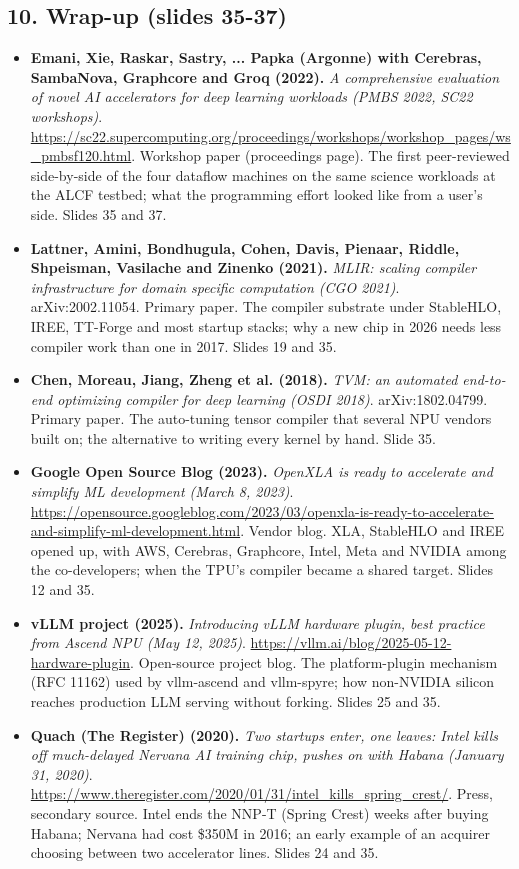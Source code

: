 \documentclass[11pt,letterpaper]{article}
\begin{document}
\subsection*{10. Wrap-up (slides 35-37)}
\begin{itemize}[leftmargin=1.2em,itemsep=3pt]\sloppy
\item \textbf{Emani, Xie, Raskar, Sastry, ... Papka (Argonne) with Cerebras, SambaNova, Graphcore and Groq (2022).} \textit{A comprehensive evaluation of novel AI accelerators for deep learning workloads (PMBS 2022, SC22 workshops)}. \url{https://sc22.supercomputing.org/proceedings/workshops/workshop_pages/ws_pmbsf120.html}. Workshop paper (proceedings page). The first peer-reviewed side-by-side of the four dataflow machines on the same science workloads at the ALCF testbed; what the programming effort looked like from a user's side. Slides 35 and 37.
\item \textbf{Lattner, Amini, Bondhugula, Cohen, Davis, Pienaar, Riddle, Shpeisman, Vasilache and Zinenko (2021).} \textit{MLIR: scaling compiler infrastructure for domain specific computation (CGO 2021)}. arXiv:2002.11054. Primary paper. The compiler substrate under StableHLO, IREE, TT-Forge and most startup stacks; why a new chip in 2026 needs less compiler work than one in 2017. Slides 19 and 35.
\item \textbf{Chen, Moreau, Jiang, Zheng et al. (2018).} \textit{TVM: an automated end-to-end optimizing compiler for deep learning (OSDI 2018)}. arXiv:1802.04799. Primary paper. The auto-tuning tensor compiler that several NPU vendors built on; the alternative to writing every kernel by hand. Slide 35.
\item \textbf{Google Open Source Blog (2023).} \textit{OpenXLA is ready to accelerate and simplify ML development (March 8, 2023)}. \url{https://opensource.googleblog.com/2023/03/openxla-is-ready-to-accelerate-and-simplify-ml-development.html}. Vendor blog. XLA, StableHLO and IREE opened up, with AWS, Cerebras, Graphcore, Intel, Meta and NVIDIA among the co-developers; when the TPU's compiler became a shared target. Slides 12 and 35.
\item \textbf{vLLM project (2025).} \textit{Introducing vLLM hardware plugin, best practice from Ascend NPU (May 12, 2025)}. \url{https://vllm.ai/blog/2025-05-12-hardware-plugin}. Open-source project blog. The platform-plugin mechanism (RFC 11162) used by vllm-ascend and vllm-spyre; how non-NVIDIA silicon reaches production LLM serving without forking. Slides 25 and 35.
\item \textbf{Quach (The Register) (2020).} \textit{Two startups enter, one leaves: Intel kills off much-delayed Nervana AI training chip, pushes on with Habana (January 31, 2020)}. \url{https://www.theregister.com/2020/01/31/intel_kills_spring_crest/}. Press, secondary source. Intel ends the NNP-T (Spring Crest) weeks after buying Habana; Nervana had cost \$350M in 2016; an early example of an acquirer choosing between two accelerator lines. Slides 24 and 35.

\end{itemize}
\end{document}
